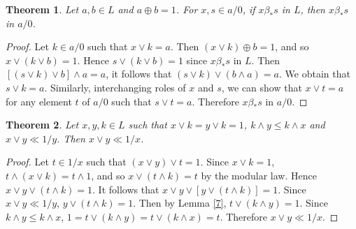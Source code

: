 \documentclass[11pt,reqno]{amsart} %
\theoremstyle{plain}
\newtheorem{theorem}{Theorem}
\theoremstyle{definition}
\theoremstyle{remark}
\numberwithin{equation}{section}
\begin{document}
\begin{theorem}\label{15}
  Let $ a, b \in L $ and $ a \oplus b = 1 $. For $ x,s \in a/0 $, if $ x \beta_* s $ in $ L $, then $ x \beta_* s $ in $ a/0 $.
\end{theorem}

\begin{proof}
  Let $ k \in a/0 $ such that $ x \vee k = a $. Then $ (x \vee k ) \oplus b = 1 $, and so $ x \vee ( k \vee b ) = 1 $. 
  Hence $ s \vee ( k \vee b ) = 1 $ since $ x \beta_* s $ in $ L $. Then $ \left[ (s \vee k ) \vee b \right] \wedge a = a $, 
  it follows that $ ( s \vee k ) \vee ( b \wedge a ) = a $. We obtain that $ s \vee k = a $. Similarly, interchanging 
  roles of $ x $ and $ s $, we can show that $ x \vee t = a $ for any element $ t $ of $ a/0 $ such that $ s \vee t = a $. 
  Therefore $ x \beta_* s $ in $ a/0 $.
\end{proof}


\begin{theorem}\label{16}
  Let $ x,y,k \in L $ such that $ x \vee k = y \vee k = 1 $, $ k \wedge y \leq k \wedge x $ and $ x \vee y \ll 1/y $. 
  Then $ x \vee y \ll 1/x $.
\end{theorem}

\begin{proof}
  Let $ t \in 1/x $ such that $ ( x \vee y ) \vee t = 1 $. Since $ x \vee k = 1 $, $ t \wedge ( x \vee k ) = t \wedge 1 $, 
  and so $ x \vee ( t \wedge k ) = t $ by the modular law. Hence $ x \vee y \vee ( t \wedge k ) = 1 $. 
  It follows that $ x \vee y \vee \left[ y \vee ( t \wedge k ) \right] = 1 $. Since $ x \vee y \ll 1/y $, 
  $ y \vee ( t \wedge k ) = 1 $. Then by Lemma \ref{7}, $ t \vee ( k \wedge y ) = 1 $. 
  Since $ k \wedge y \leq k \wedge x $, $ 1 = t \vee ( k \wedge y ) = t \vee ( k \wedge x ) =t $. Therefore $ x \vee y \ll 1/x $.
\end{proof}
\end{document}
